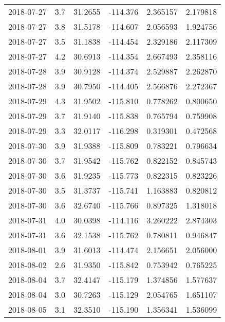 \begin{tabular}{lrrrrr}
2018-07-27 &       3.7 &  31.2655 &  -114.376 &         2.365157 &         2.179818 \\
2018-07-27 &       3.8 &  31.5178 &  -114.607 &         2.056593 &         1.924756 \\
2018-07-27 &       3.5 &  31.1838 &  -114.454 &         2.329186 &         2.117309 \\
2018-07-27 &       4.2 &  30.6913 &  -114.354 &         2.667493 &         2.358116 \\
2018-07-28 &       3.9 &  30.9128 &  -114.374 &         2.529887 &         2.262870 \\
2018-07-28 &       3.9 &  30.7950 &  -114.405 &         2.566876 &         2.272367 \\
2018-07-29 &       4.3 &  31.9502 &  -115.810 &         0.778262 &         0.800650 \\
2018-07-29 &       3.7 &  31.9140 &  -115.838 &         0.765794 &         0.759908 \\
2018-07-29 &       3.3 &  32.0117 &  -116.298 &         0.319301 &         0.472568 \\
2018-07-30 &       3.9 &  31.9388 &  -115.809 &         0.783221 &         0.796634 \\
2018-07-30 &       3.7 &  31.9542 &  -115.762 &         0.822152 &         0.845743 \\
2018-07-30 &       3.6 &  31.9235 &  -115.773 &         0.822315 &         0.823226 \\
2018-07-30 &       3.5 &  31.3737 &  -115.741 &         1.163883 &         0.820812 \\
2018-07-30 &       3.6 &  32.6740 &  -115.766 &         0.897325 &         1.318018 \\
2018-07-31 &       4.0 &  30.0398 &  -114.116 &         3.260222 &         2.874303 \\
2018-07-31 &       3.6 &  32.1538 &  -115.762 &         0.780811 &         0.946847 \\
2018-08-01 &       3.9 &  31.6013 &  -114.474 &         2.156651 &         2.056000 \\
2018-08-02 &       2.6 &  31.9350 &  -115.842 &         0.753942 &         0.765225 \\
2018-08-04 &       3.7 &  32.4147 &  -115.179 &         1.374856 &         1.577637 \\
2018-08-04 &       3.0 &  30.7263 &  -115.129 &         2.054765 &         1.651107 \\
2018-08-05 &       3.1 &  32.3510 &  -115.190 &         1.356341 &         1.536099 \\

\end{tabular}
